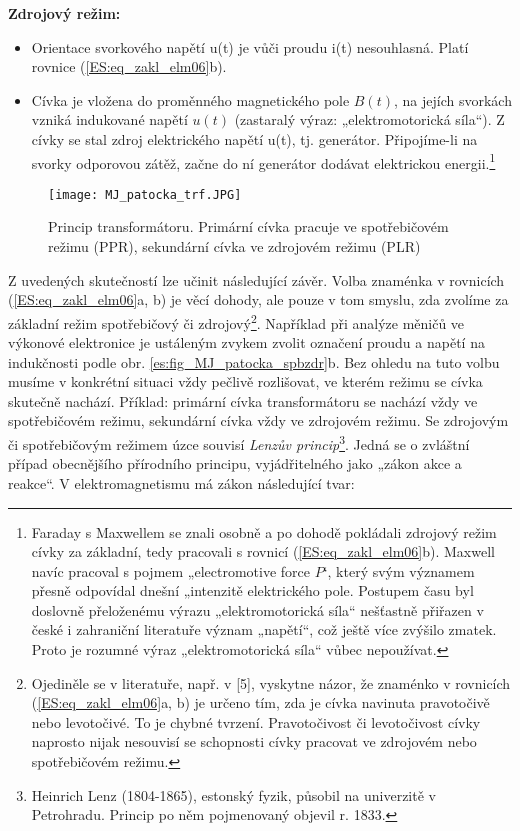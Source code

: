     \textbf{Zdrojový režim:}
    \begin{itemize}
      \item Orientace svorkového napětí u(t) je vůči proudu i(t) nesouhlasná. Platí rovnice
            (\ref{ES:eq_zakl_elm06}b).
      \item Cívka je vložena do proměnného magnetického pole \(B(t)\), na jejích svorkách vzniká
            indukované napětí \(u(t)\) (zastaralý výraz: „elektromotorická síla“). Z cívky se stal
            zdroj elektrického napětí u(t), tj. generátor. Připojíme-li na svorky odporovou zátěž,
            začne do ní generátor dodávat elektrickou energii.\footnote{Faraday s Maxwellem se
            znali osobně a po dohodě pokládali zdrojový režim cívky za základní, tedy pracovali s
            rovnicí (\ref{ES:eq_zakl_elm06}b). Maxwell navíc pracoval s pojmem „electromotive force
            \(P\)‘, který svým významem přesně odpovídal dnešní „intenzitě elektrického pole.
            Postupem času byl doslovně přeloženému výrazu „elektromotorická síla“ nešťastně
            přiřazen v české i zahraniční literatuře význam „napětí“, což ještě více zvýšilo
            zmatek. Proto je rozumné výraz „elektromotorická síla“ vůbec nepoužívat.}
    \end{itemize}
    \begin{figure}[ht!]
      \centering
      \texttt{[image: MJ\_patocka\_trf.JPG]}
      \caption[Princip transformátoru.]{Princip transformátoru. Primární cívka pracuje ve
               spotřebičovém režimu (PPR), sekundární cívka ve zdrojovém režimu (PLR)}
      \label{es:fig_MJ_patocka_trf}
    \end{figure}    
    Z uvedených skutečností lze učinit následující závěr. Volba znaménka v rovnicích
    (\ref{ES:eq_zakl_elm06}a, b) je věcí dohody, ale pouze v tom smyslu, zda zvolíme za základní
    režim spotřebičový či zdrojový\footnote{Ojediněle se v literatuře, např. v [5], vyskytne názor,
    že znaménko v rovnicích (\ref{ES:eq_zakl_elm06}a, b) je určeno tím, zda je cívka navinuta
    pravotočivě nebo levotočivé. To je chybné tvrzení. Pravotočivost či levotočivost cívky naprosto
    nijak nesouvisí se schopnosti cívky pracovat ve zdrojovém nebo spotřebičovém režimu.}. 
    Například při analýze měničů ve výkonové elektronice je ustáleným zvykem zvolit označení proudu
    a napětí na indukčnosti podle obr. \ref{es:fig_MJ_patocka_spbzdr}b. Bez ohledu na tuto volbu
    musíme v konkrétní situaci vždy pečlivě rozlišovat, ve kterém režimu se cívka skutečně nachází.
    Příklad: primární cívka transformátoru se nachází vždy ve spotřebičovém režimu, sekundární
    cívka vždy ve zdrojovém režimu. Se zdrojovým či spotřebičovým režimem úzce souvisí \emph{Lenzův
    princip}\footnote{Heinrich Lenz (1804-1865), estonský fyzik, působil na univerzitě v
    Petrohradu. Princip po něm pojmenovaný objevil r. 1833.}. Jedná se o zvláštní případ
    obecnějšího přírodního principu, vyjádřitelného jako „zákon akce a reakce“. V elektromagnetismu
    má zákon následující tvar:


